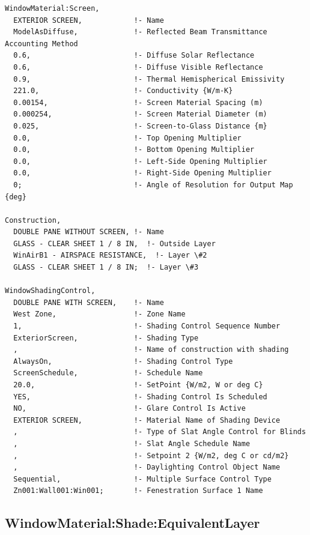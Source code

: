 \begin{lstlisting}
WindowMaterial:Screen,
  EXTERIOR SCREEN,            !- Name
  ModelAsDiffuse,             !- Reflected Beam Transmittance Accounting Method
  0.6,                        !- Diffuse Solar Reflectance
  0.6,                        !- Diffuse Visible Reflectance
  0.9,                        !- Thermal Hemispherical Emissivity
  221.0,                      !- Conductivity {W/m-K}
  0.00154,                    !- Screen Material Spacing (m)
  0.000254,                   !- Screen Material Diameter (m)
  0.025,                      !- Screen-to-Glass Distance {m}
  0.0,                        !- Top Opening Multiplier
  0.0,                        !- Bottom Opening Multiplier
  0.0,                        !- Left-Side Opening Multiplier
  0.0,                        !- Right-Side Opening Multiplier
  0;                          !- Angle of Resolution for Output Map {deg}

Construction,
  DOUBLE PANE WITHOUT SCREEN, !- Name
  GLASS - CLEAR SHEET 1 / 8 IN,  !- Outside Layer
  WinAirB1 - AIRSPACE RESISTANCE,  !- Layer \#2
  GLASS - CLEAR SHEET 1 / 8 IN;  !- Layer \#3

WindowShadingControl,
  DOUBLE PANE WITH SCREEN,    !- Name
  West Zone,                  !- Zone Name
  1,                          !- Shading Control Sequence Number
  ExteriorScreen,             !- Shading Type
  ,                           !- Name of construction with shading
  AlwaysOn,                   !- Shading Control Type
  ScreenSchedule,             !- Schedule Name
  20.0,                       !- SetPoint {W/m2, W or deg C}
  YES,                        !- Shading Control Is Scheduled
  NO,                         !- Glare Control Is Active
  EXTERIOR SCREEN,            !- Material Name of Shading Device
  ,                           !- Type of Slat Angle Control for Blinds
  ,                           !- Slat Angle Schedule Name
  ,                           !- Setpoint 2 {W/m2, deg C or cd/m2}
  ,                           !- Daylighting Control Object Name
  Sequential,                 !- Multiple Surface Control Type
  Zn001:Wall001:Win001;       !- Fenestration Surface 1 Name
\end{lstlisting}

\subsection{WindowMaterial:Shade:EquivalentLayer}\label{windowmaterialshadeequivalentlayer}

